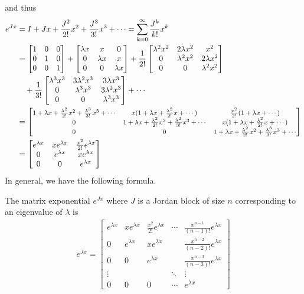 and thus
\begin{align*}
e^{Jx} &= I + Jx + \frac{J^2}{2!}x^2 + \frac{J^3}{3!}x^3 + \cdots = \sum_{k=0}^{\infty} \frac{J^k}{k!}x^k  \\
&= 
\begin{bmatrix}
1 & 0 & 0 \\
0 & 1 & 0 \\
0 & 0 & 1
\end{bmatrix}
+ 
\begin{bmatrix}
\lambda x & x & 0\\ 
0 & \lambda x & x \\
0 & 0 & \lambda x
\end{bmatrix}
+ \frac{1}{2!}
\begin{bmatrix}
\lambda^2x^2 & 2\lambda x^2 & x^2 \\ 
0 & \lambda^2x^2 & 2\lambda x^2 \\
0 & 0 & \lambda^2x^2
\end{bmatrix} \\
&\quad + \frac{1}{3!}
\begin{bmatrix}
\lambda^3x^3 & 3\lambda^2x^3 & 3\lambda x^3\\
0 & \lambda^3x^3 & 3\lambda^2x^3 \\
0 & 0 & \lambda^3x^3
\end{bmatrix} + \cdots \\
&= 
\footnotesize
\begin{bmatrix}
1 + \lambda x + \frac{\lambda^2}{2!}x^2 + \frac{\lambda^3}{3!}x^3 + \cdots & x(1 + \lambda x + \frac{\lambda^2}{2!}x + \cdots) & \frac{x^2}{2!}(1 + \lambda x + \cdots) \\
0 & 1 + \lambda x + \frac{\lambda^2}{2!}x^2 + \frac{\lambda^3}{3!}x^3 + \cdots & x(1 + \lambda x + \frac{\lambda^2}{2!}x + \cdots) \\
0 & 0 & 1 + \lambda x + \frac{\lambda^2}{2!}x^2 + \frac{\lambda^3}{3!}x^3 + \cdots
\end{bmatrix} \\
&=
\begin{bmatrix}
e^{\lambda x} & xe^{\lambda x} & \frac{x^2}{2!}e^{\lambda x} \\
0 & e^{\lambda x} & xe^{\lambda x} \\
0 & 0 & e^{\lambda x}
\end{bmatrix}
\end{align*}
In general, we have the following formula.
\begin{proper}
The matrix exponential $e^{Jx}$ where $J$ is a Jordan block of size $n$ corresponding to an eigenvalue of $\lambda$ is
\begin{align}
e^{Jx} =
\begin{bmatrix}
e^{\lambda x} & xe^{\lambda x} & \frac{x^2}{2!}e^{\lambda x} & \cdots & \frac{x^{n-1}}{(n-1)!} e^{\lambda x} \\
0 & e^{\lambda x} & xe^{\lambda x} & & \frac{x^{n-2}}{(n-2)!} e^{\lambda x} \\
0 & 0 &e^{\lambda x} & & \frac{x^{n-3}}{(n-3)!} e^{\lambda x} \\
\vdots & & & \ddots & \vdots \\
0 & 0 & 0 & \cdots & e^{\lambda x}
\end{bmatrix}
\end{align}
\end{proper}
